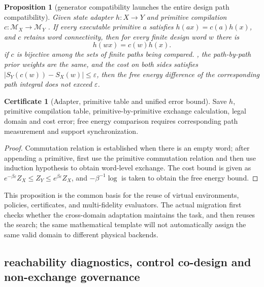 \documentclass[11pt,a4paper]{article}
\theoremstyle{plain}
\newtheorem{proposition}[theorem]{Proposition}
\theoremstyle{definition}
\newtheorem*{certificate}{Certificate}
\theoremstyle{remark}
\begin{document}
\begin{CJK*}
\begin{proposition}
[generator compatibility launches the entire design path compatibility]\label{fa:prop-compile}
Given state adapter $h:X\to Y$ and primitive compilation $c:\mathcal M_X\to\mathcal M_Y$ . If every executable primitive $a$ satisfies $h(a x)=c(a)h(x)$, and $c$ retains word connectivity, then for every finite design word $w$ there is \[
 h(w x)=c(w)h(x).
\] if $c$ is bijective among the sets of finite paths being compared. , the path-by-path prior weights are the same, and the cost on both sides satisfies $|S_Y(c(w))-S_X(w)|\le\varepsilon$, then the free energy difference of the corresponding path integral does not exceed $\varepsilon$.\end{proposition}
\begin{certificate}
[Adapter, primitive table and unified error bound]Save $h$, primitive compilation table, primitive-by-primitive exchange calculation, legal domain and cost error; free energy comparison requires corresponding path measurement and support synchronization.\end{certificate}
\begin{proof}
Commutation relation is established when there is an empty word; after appending a primitive, first use the primitive commutation relation and then use induction hypothesis to obtain word-level exchange. The cost bound is given as $e^{-\beta\varepsilon}Z_X\le Z_Y\le e^{\beta\varepsilon}Z_X$, and $-\beta^{-1}\log$ is taken to obtain the free energy bound.\end{proof}


This proposition is the common basis for the reuse of virtual environments, policies, certificates, and multi-fidelity evaluators. The actual migration first checks whether the cross-domain adaptation maintains the task, and then reuses the search; the same mathematical template will not automatically assign the same valid domain to different physical backends.

\subsection { reachability diagnostics, control co-design and non-exchange governance }


\end{CJK*}
\end{document}
